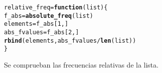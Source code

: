 \documentclass[12pt]{report}\usepackage[]{graphicx}\usepackage[dvipsnames]{xcolor}
\makeatletter
\newcommand{\hlnum}[1]{\textcolor[rgb]{0.686,0.059,0.569}{#1}}%
\newcommand{\hlopt}[1]{\textcolor[rgb]{0,0,0}{#1}}%
\newcommand{\hlstd}[1]{\textcolor[rgb]{0.345,0.345,0.345}{#1}}%
\newcommand{\hlkwa}[1]{\textcolor[rgb]{0.161,0.373,0.58}{\textbf{#1}}}%
\newcommand{\hlkwb}[1]{\textcolor[rgb]{0.69,0.353,0.396}{#1}}%
\newcommand{\hlkwc}[1]{\textcolor[rgb]{0.333,0.667,0.333}{#1}}%
\newcommand{\hlkwd}[1]{\textcolor[rgb]{0.737,0.353,0.396}{\textbf{#1}}}%
\newenvironment{kframe}{%
 \def\at@end@of@kframe{}%
 \ifinner\ifhmode%
  \def\at@end@of@kframe{\end{minipage}}%
  \begin{minipage}{\columnwidth}%
 \fi\fi%
 \def\FrameCommand##1{\hskip\@totalleftmargin \hskip-\fboxsep
 \colorbox{shadecolor}{##1}\hskip-\fboxsep
     \hskip-\linewidth \hskip-\@totalleftmargin \hskip\columnwidth}%
 \MakeFramed {\advance\hsize-\width
   \@totalleftmargin\z@ \linewidth\hsize
   \@setminipage}}%
 {\par\unskip\endMakeFramed%
 \at@end@of@kframe}
\newenvironment{knitrout}{}{} %
\makeatother
\begin{document}
\begin{knitrout}
\color{fgcolor}\begin{kframe}
\begin{alltt}
\hlstd{relative_freq} \hlkwb{=} \hlkwa{function}\hlstd{(}\hlkwc{list}\hlstd{) \{}
        \hlstd{f_abs} \hlkwb{=} \hlkwd{absolute_freq}\hlstd{(list)}
        \hlstd{elements} \hlkwb{=} \hlstd{f_abs[}\hlnum{1}\hlstd{,]}
        \hlstd{abs_fvalues} \hlkwb{=} \hlstd{f_abs[}\hlnum{2}\hlstd{,]}
        \hlkwd{rbind}\hlstd{(elements, abs_fvalues}\hlopt{/}\hlkwd{len}\hlstd{(list))}
\hlstd{\}}
\end{alltt}
\end{kframe}
\end{knitrout}
			
			Se comprueban las frecuencias relativas de la lista.
			
\end{document}
